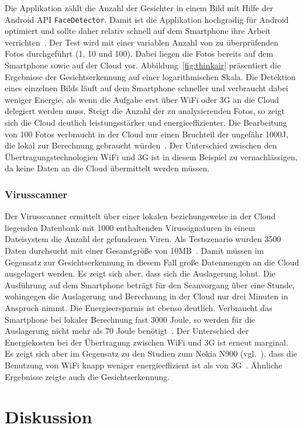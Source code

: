\documentclass{sigchi}
\begin{document}
Die Applikation zählt die Anzahl der Gesichter in einem Bild mit Hilfe der Android API \texttt{FaceDetector}.
Damit ist die Applikation hochgradig für Android optimiert und sollte daher relativ schnell auf dem Smartphone ihre Arbeit verrichten~\cite{thinkair}.
Der Test wird mit einer variablen Anzahl von zu überprüfenden Fotos durchgeführt (1, 10 und 100).
Dabei liegen die Fotos bereits auf dem Smartphone sowie auf der Cloud vor.
Abbildung~\ref{fig:thinkair} präsentiert die Ergebnisse der Gesichtserkennung auf einer logarithmischen Skala.
Die Detektion eines einzelnen Bilds läuft auf dem Smartphone schneller und verbraucht dabei weniger Energie, als wenn die Aufgabe erst über WiFi oder 3G an die Cloud delegiert werden muss.
Steigt die Anzahl der zu analysierenden Fotos, so zeigt sich die Cloud deutlich leistungsstärker und energieeffizienter.
Die Bearbeitung von 100 Fotos verbraucht in der Cloud nur einen Bruchteil der ungefähr 1000J, die lokal zur Berechnung gebraucht würden~\cite{thinkair}.
Der Unterschied zwischen den Übertragungstechnologien WiFi und 3G ist in diesem Beispiel zu vernachlässigen, da keine Daten an die Cloud übermittelt werden müssen.

\subsubsection{Virusscanner}
Der Virusscanner ermittelt über einer lokalen beziehungsweise in der Cloud liegenden Datenbank mit 1000 enthaltenden Virussignaturen in einem Dateisystem die Anzahl der gefundenen Viren.
Als Testszenario wurden 3500 Daten durchsucht mit einer Gesamtgröße von 10MB~\cite{thinkair}.
Damit müssen im Gegensatz zur Gesichtserkennung in diesem Fall große Datenmengen an die Cloud ausgelagert werden.
Es zeigt sich aber, dass sich die Auslagerung lohnt.
Die Ausführung auf dem Smartphone beträgt für den Scanvorgang über eine Stunde, wohingegen  die Auslagerung und Berechnung in der Cloud nur drei Minuten in Anspruch nimmt.
Die Energieersparnis ist ebenso deutlich.
Verbraucht das Smartphone bei lokaler Berechnung fast 3000 Joule, so werden für die Auslagerung nicht mehr als 70 Joule benötigt~\cite{thinkair}.
Der Unterschied der Energiekosten bei der Übertragung zwischen WiFi und 3G ist erneut marginal.
Es zeigt sich aber im Gegensatz zu den Studien zum Nokia N900 (vgl.~\cite{o8, o12}), dass die Benutzung von WiFi knapp weniger energieeffizient ist als von 3G~\cite{thinkair}.
Ähnliche Ergebnisse zeigte auch die Gesichtserkennung.

\section{Diskussion}
\end{document}
